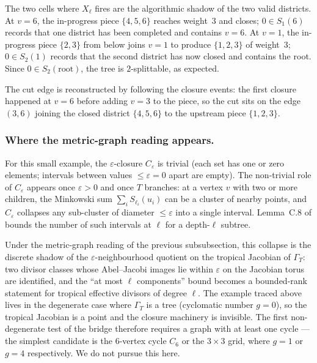\documentclass[11pt]{article}
\begin{document}
The two cells where $X_\ell$ fires are the algorithmic shadow of the
two valid districts. At $v = 6$, the in-progress piece $\{4, 5, 6\}$
reaches weight~$3$ and closes; $0 \in S_1(6)$ records that one district
has been completed and contains $v=6$. At $v = 1$, the in-progress
piece $\{2, 3\}$ from below joins $v=1$ to produce $\{1, 2, 3\}$ of
weight~$3$; $0 \in S_2(1)$ records that the second district has now
closed and contains the root. Since $0 \in S_2(\mathrm{root})$, the
tree is $2$-splittable, as expected.

The cut edge is reconstructed by following the closure events: the
first closure happened at $v = 6$ before adding $v = 3$ to the piece,
so the cut sits on the edge $(3, 6)$ joining the closed district
$\{4,5,6\}$ to the upstream piece $\{1,2,3\}$.

\subsubsection*{Where the metric-graph reading appears.}

For this small example, the $\varepsilon$-closure $C_\varepsilon$
is trivial (each set has one or zero elements; intervals between values
$\leq \varepsilon = 0$ apart are empty). The non-trivial role of
$C_\varepsilon$ appears once $\varepsilon > 0$ and once $T$ branches:
at a vertex $v$ with two or more children, the Minkowski sum
$\sum_i S_{\ell_i}(u_i)$ can be a cluster of nearby points, and
$C_\varepsilon$ collapses any sub-cluster of diameter $\leq \varepsilon$
into a single interval. Lemma~C.8 of \cite{akitaya2026bud} bounds the
number of such intervals at $\ell$ for a depth-$\ell$ subtree.

Under the metric-graph reading of the previous subsubsection, this
collapse is the discrete shadow of the
$\varepsilon$-neighbourhood quotient on the tropical Jacobian of $\Gamma_T$:
two divisor classes whose Abel--Jacobi images lie within
$\varepsilon$ on the Jacobian torus are identified, and the
``at most $\ell$ components'' bound becomes a bounded-rank statement
for tropical effective divisors of degree $\ell$. The example traced
above lives in the degenerate case where $\Gamma_T$ is a tree
(cyclomatic number $g = 0$), so the tropical Jacobian is a point and
the closure machinery is invisible. The first non-degenerate test of
the bridge therefore requires a graph with at least one cycle --- the
simplest candidate is the $6$-vertex cycle $C_6$ or the $3 \times 3$
grid, where $g = 1$ or $g = 4$ respectively. We do not pursue this
here.
\end{document}

